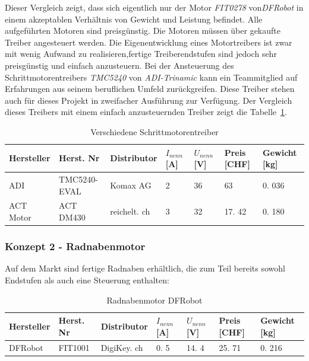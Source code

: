 \documentclass[main.  tex]{subfiles} %
\begin{document}
Dieser Vergleich zeigt, dass sich eigentlich nur der Motor \textit{FIT0278}
von\textit{DFRobot} in einem akzeptablen Verhältnis von Gewicht und Leistung
befindet. Alle aufgeführten Motoren sind preisgünstig. Die Motoren müssen über
gekaufte Treiber angesteuert werden. Die Eigenentwicklung eines Motortreibers
ist zwar mit wenig Aufwand zu realisieren,fertige Treiberendstufen sind jedoch
sehr preisgünstig und einfach anzusteuern. Bei der Ansteuerung des
Schrittmotorentreibers \textit{TMC5240} von \textit{ADI-Trinamic} kann ein
Teammitglied auf Erfahrungen aus seinem beruflichen Umfeld zurückgreifen. Diese
Treiber stehen auch für dieses Projekt in zweifacher Ausführung zur Verfügung.
Der Vergleich dieses Treibers mit einem einfach anzusteuernden Treiber zeigt
die Tabelle~\ref{tab:Schrittmotorentreiber_different}.

\begin{table}[h]
    \centering
    \begin{tabular}{|p{2cm}|p{3cm}|p{2cm}|p{1cm}|p{1cm}|p{1cm}|p{}|}
        \hline
        Hersteller & Herst.  Nr   & Distributor   & $I_{nenn} $ [A] & $U_{nenn}$ [V] & Preis [CHF] & Gewicht [kg] \\ \hline
        ADI        & TMC5240-EVAL & Komax AG      & 2               & 36             & 63          & 0.  036      \\ \hline
        ACT Motor  & ACT DM430    & reichelt.  ch & 3               & 32             & 17.  42     & 0.  180      \\ \hline
    \end{tabular}
    \caption{Verschiedene Schrittmotorentreiber}
    \label{tab:Schrittmotorentreiber_different}
\end{table}

\subsubsection*{Konzept 2 - Radnabenmotor} %

Auf dem Markt sind fertige Radnaben erhältlich, die zum Teil bereits sowohl
Endstufen als auch eine Steuerung enthalten:

\begin{table}[h]
    \centering
    \begin{tabular}{|p{2cm}|p{3cm}|p{2cm}|p{1cm}|p{1cm}|p{1cm}|p{}|}
        \hline
        Hersteller & Herst.  Nr & Distributor  & $I_{nenn} $ [A] & $U_{nenn}$ [V] & Preis [CHF] & Gewicht [kg] \\ \hline
        DFRobot    & FIT1001    & DigiKey.  ch & 0.  5           & 14.  4         & 25.  71     & 0.  216      \\ \hline
    \end{tabular}
    \caption{Radnabenmotor DFRobot}
\end{table}
\end{document}

